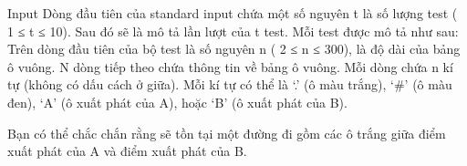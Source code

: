 Input  
Dòng đầu tiên của standard input chứa một số nguyên t là số lượng test ( 1 ≤ t ≤ 10). Sau đó sẽ là mô tả lần lượt của t test. Mỗi test được mô tả như sau: Trên dòng đầu tiên của bộ test là số nguyên n ( 2 ≤ n ≤ 300), là độ dài của bảng ô vuông. N dòng tiếp theo chứa thông tin về bảng ô vuông. Mỗi dòng chứa n kí tự (không có dấu cách ở giữa). Mỗi kí tự có thể là ‘.’ (ô màu trắng), ‘\#’ (ô màu đen), ‘A’ (ô xuất phát của A), hoặc ‘B’ (ô xuất phát của B).  

   Bạn có thể chắc chắn rằng sẽ tồn tại một đường đi gồm các ô trắng giữa điểm xuất phát của A và điểm xuất phát của B.